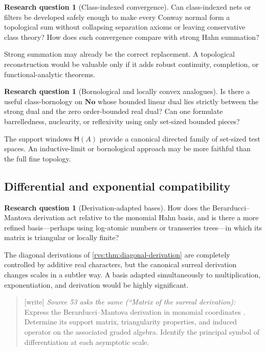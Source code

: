 \documentclass[11pt,letterpaper]{article}
\numberwithin{equation}{section}
\theoremstyle{definition}
\newtheorem{question}[theorem]{Research question}
\theoremstyle{remark}
\newcommand{\No}{\mathbf{No}}
\newcommand{\Hahn}{\mathsf{H}}
\newcommand{\wtag}{\textup{[write]}}%
\begin{document}
\begin{question}[Class-indexed convergence]
Can class-indexed nets or filters be developed safely enough to make every
Conway normal form a topological sum without collapsing separation axioms or
leaving conservative class theory?  How does such convergence compare with
strong Hahn summation?
\end{question}

Strong summation may already be the correct replacement.  A topological
reconstruction would be valuable only if it adds robust continuity,
completion, or functional-analytic theorems.

\begin{question}[Bornological and locally convex analogues]
Is there a useful class-bornology on \(\No\) whose bounded linear dual lies
strictly between the strong dual and the zero order-bounded real dual?  Can
one formulate barrelledness, nuclearity, or reflexivity using only set-sized
bounded pieces?
\end{question}

The support windows \(\Hahn(A)\) provide a canonical directed family of
set-sized test spaces.  An inductive-limit or bornological approach may be
more faithful than the full fine topology.

\subsection{Differential and exponential compatibility}

\begin{question}[Derivation-adapted bases]
How does the Berarducci--Mantova derivation act relative to the monomial Hahn
basis, and is there a more refined basis---perhaps using log-atomic numbers or
transseries trees---in which its matrix is triangular or locally finite?
\end{question}

The diagonal derivations of \cref{rvs:thm:diagonal-derivation} are completely
controlled by additive real characters, but the canonical surreal derivation
changes scales in a subtler way.  A basis adapted simultaneously to
multiplication, exponentiation, and derivation would be highly significant.
\begin{quote}\small
\wtag{} \emph{Source 53 asks the same (``Matrix of the surreal derivation):}
Express the Berarducci--Mantova derivation in monomial coordinates \cite{BerarducciMantova}. Determine its
support matrix, triangularity properties, and induced operator on the associated
graded algebra. Identify the principal symbol of differentiation at each asymptotic
scale.
\end{quote}
\end{document}
